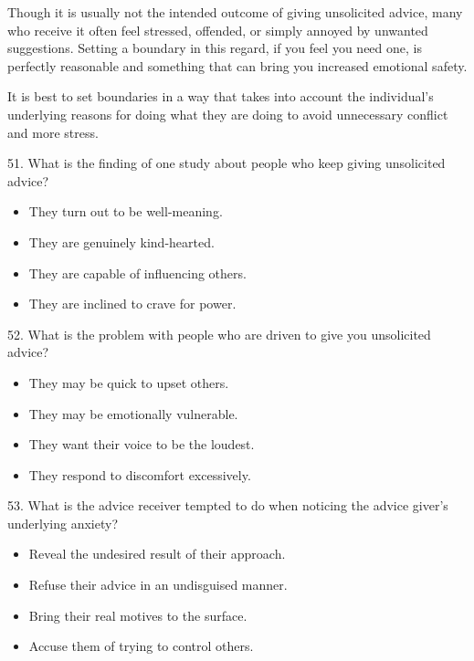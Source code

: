 \documentclass[UTF8,11pt]{ctexart}
\begin{document}
Though it is usually not the intended outcome of giving unsolicited advice, many who receive it often feel stressed, offended, or simply annoyed by unwanted suggestions. Setting a boundary in this regard, if you feel you need one, is perfectly reasonable and something that can bring you increased emotional safety.


It is best to set boundaries in a way that takes into account the individual’s underlying reasons for doing what they are doing to avoid unnecessary conflict and more stress.


51. What is the finding of one study about people who keep giving unsolicited advice?


\begin{itemize}[leftmargin=2em,itemsep=.2em,topsep=.4em]\item[A.] They turn out to be well-meaning.
\item[B.] They are genuinely kind-hearted.
\item[C.] They are capable of influencing others.
\item[D.] They are inclined to crave for power.
\end{itemize}

52. What is the problem with people who are driven to give you unsolicited advice?


\begin{itemize}[leftmargin=2em,itemsep=.2em,topsep=.4em]\item[A.] They may be quick to upset others.
\item[B.] They may be emotionally vulnerable.
\item[C.] They want their voice to be the loudest.
\item[D.] They respond to discomfort excessively.
\end{itemize}

53. What is the advice receiver tempted to do when noticing the advice giver’s underlying anxiety?


\begin{itemize}[leftmargin=2em,itemsep=.2em,topsep=.4em]\item[A.] Reveal the undesired result of their approach.
\item[B.] Refuse their advice in an undisguised manner.
\item[C.] Bring their real motives to the surface.
\item[D.] Accuse them of trying to control others.
\end{itemize}
\end{document}
